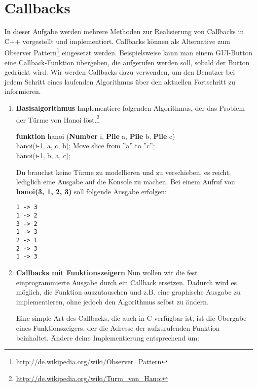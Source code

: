 \section{Callbacks}
In dieser Aufgabe werden mehrere Methoden zur Realisierung von Callbacks in C++ vorgestellt und implementiert. 
Callbacks können als Alternative zum Observer Pattern\footnote{\url{http://de.wikipedia.org/wiki/Observer_Pattern}} eingesetzt werden.
Beispielsweise kann man einem GUI-Button eine Callback-Funktion übergeben, die aufgerufen werden soll, sobald der Button gedrückt wird.
Wir werden Callbacks dazu verwenden, um den Benutzer bei jedem Schritt eines laufenden Algorithmus über den aktuellen Fortschritt zu informieren.

\begin{enumerate}

\item \textbf{Basisalgorithmus}
Implementiere folgenden Algorithmus, der das Problem der Türme von Hanoi löst.\footnote{\url{http://de.wikipedia.org/wiki/Turm_von_Hanoi}} \\
\begin{algorithm}[H]
 \SetAlgoLined
 \textbf{funktion} hanoi (\textbf{Number} i, \textbf{Pile} a, \textbf{Pile} b, \textbf{Pile} c) { \\
      {
        hanoi(i-1, a, c, b); 
        Move slice from ''a'' to ''c''; \\
        hanoi(i-1, b, a, c); 
     }
 }
\end{algorithm}

Du brauchst keine Türme zu modellieren und zu verschieben, es reicht, lediglich eine Ausgabe auf die Konsole zu machen. Bei einem Aufruf von \textbf{hanoi(3, 1, 2, 3)} soll folgende Ausgabe erfolgen:
\begin{lstlisting}
1 -> 3
1 -> 2
3 -> 2
1 -> 3
2 -> 1
2 -> 3
1 -> 3
\end{lstlisting}

\item \textbf{Callbacks mit Funktionszeigern}
Nun wollen wir die fest einprogrammierte Ausgabe durch ein Callback ersetzen. Dadurch wird es möglich, die Funktion auszutauschen und z.B. eine graphische Ausgabe zu implementieren, ohne jedoch den Algorithmus selbst zu ändern.

Eine simple Art des Callbacks, die auch in C verfügbar ist, ist die Übergabe eines Funktionszeigers, der die Adresse der aufzurufenden Funktion beinhaltet.
Ändere deine Implementierung entsprechend um:


\end{enumerate}
